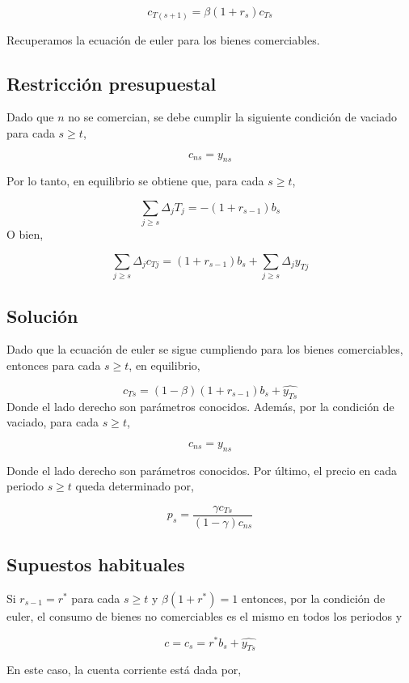 \documentclass[]{article}
\begin{document}
\[
c_{T(s+1)} = \beta(1 +r_{s})c_{Ts}
\]

Recuperamos la ecuación de euler para los bienes comerciables.

\subsection{Restricción presupuestal}\label{restriccion-presupuestal-4}

Dado que \(n\) no se comercian, se debe cumplir la siguiente condición
de vaciado para cada \(s \geq t\),

\[
c_{ns} = y_{ns}
\]

Por lo tanto, en equilibrio se obtiene que, para cada \(s \geq t\),

\[
\sum_{j \geq s} \Delta_j T_j = -(1+r_{s-1})b_s
\] O bien,

\[
\sum_{j \geq s}\Delta_j c_{Tj}= (1 + r_{s-1})b_s + \sum_{j\geq s}\Delta_j y_{Tj}
\]

\subsection{Solución}\label{solucion-3}

Dado que la ecuación de euler se sigue cumpliendo para los bienes
comerciables, entonces para cada \(s \geq t\), en equilibrio,

\[
c_{Ts} = (1-\beta)(1+r_{s-1})b_s + \widehat{y_{Ts}}
\] Donde el lado derecho son parámetros conocidos. Además, por la
condición de vaciado, para cada \(s \geq t\),

\[
c_{ns} = y_{ns}
\]

Donde el lado derecho son parámetros conocidos. Por último, el precio en
cada periodo \(s \geq t\) queda determinado por,

\[
p_s  = \frac{\gamma c_{Ts}}{(1 - \gamma)c_{ns}}
\]

\subsection{Supuestos habituales}\label{supuestos-habituales-3}

Si \(r_{s-1} = r^*\) para cada \(s \geq t\) y \(\beta(1 + r^*) = 1\)
entonces, por la condición de euler, el consumo de bienes no
comerciables es el mismo en todos los periodos y

\[
c = c_s = r^*b_s + \widehat{y_{Ts}} 
\]

En este caso, la cuenta corriente está dada por,
\end{document}
